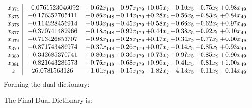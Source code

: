 \documentclass[8pt]{article}
\begin{document}
\[\begin{array}{c| c c@{\hskip 2pt} c@{\hskip 2pt} c@{\hskip 2pt} c@{\hskip 2pt} c@{\hskip 2pt} c@{\hskip 2pt} }
 x_{374}   &  -0.0761523046092 & +  0.62 x_{148} & +  0.97 x_{179} & +  0.05 x_{2} & +  0.10 x_{5} & +  0.75 x_{9} & +  0.98 x_{49}\\
 x_{375}   &  -0.176352705411 & +  0.86 x_{148} & +  0.14 x_{179} & +  0.28 x_{2} & +  0.56 x_{5} & +  0.83 x_{9} & +  0.84 x_{49}\\
 x_{376}   &  -0.114228456914 & +  0.93 x_{148} & +  0.45 x_{179} & +  0.58 x_{2} & +  0.66 x_{5} & +  0.62 x_{9} & +  0.97 x_{49}\\
 x_{377}   &  -0.370741482966 & +  0.18 x_{148} & +  0.92 x_{179} & +  0.44 x_{2} & +  0.38 x_{5} & +  0.92 x_{9} & +  0.10 x_{49}\\
 x_{378}   &  -0.713426853707 & +  0.98 x_{148} & +  0.28 x_{179} & +  0.17 x_{2} & +  0.34 x_{5} & +  0.77 x_{9} & +  0.00 x_{49}\\
 x_{379}   &  -0.871743486974 & +  0.37 x_{148} & +  0.26 x_{179} & +  0.07 x_{2} & +  0.14 x_{5} & +  0.85 x_{9} & +  0.93 x_{49}\\
 x_{380}   &  -0.342685370741 & +  0.80 x_{148} & +  0.36 x_{179} & +  0.73 x_{2} & +  0.97 x_{5} & +  0.85 x_{9} & +  0.90 x_{49}\\
 x_{381}   &  -0.821643286573 & +  0.76 x_{148} & +  0.68 x_{179} & +  0.96 x_{2} & +  0.41 x_{5} & +  0.81 x_{9} & +  1.00 x_{49}\\
\hline
z    &  26.0781563126 & -1.01 x_{148} & -0.15 x_{179} & -1.82 x_{2} & -4.13 x_{5} & -0.11 x_{9} & -0.14 x_{49}\\
\end{array}\]
Forming the dual dictionary:

The Final Dual Dictionary is: 
\end{document}
